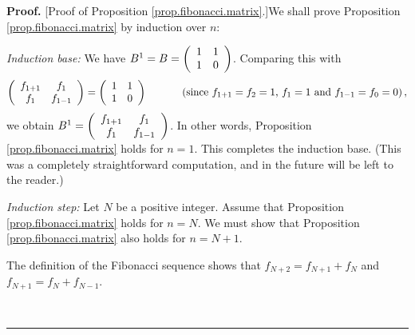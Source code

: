 \documentclass[numbers=enddot,12pt,final,onecolumn,notitlepage]{scrartcl}%
\theoremstyle{definition}
\newenvironment{proof}[1][Proof]{\noindent\textbf{#1.} }{\ \rule{0.5em}{0.5em}}
\begin{document}
\begin{proof}
[Proof of Proposition \ref{prop.fibonacci.matrix}.]We shall prove Proposition
\ref{prop.fibonacci.matrix} by induction over $n$:

\textit{Induction base:} We have $B^{1}=B=\left(
\begin{array}
[c]{cc}%
1 & 1\\
1 & 0
\end{array}
\right)  $. Comparing this with%
\[
\left(
\begin{array}
[c]{cc}%
f_{1+1} & f_{1}\\
f_{1} & f_{1-1}%
\end{array}
\right)  =\left(
\begin{array}
[c]{cc}%
1 & 1\\
1 & 0
\end{array}
\right)  \ \ \ \ \ \ \ \ \ \ \left(  \text{since }f_{1+1}=f_{2}=1\text{,
}f_{1}=1\text{ and }f_{1-1}=f_{0}=0\right)  ,
\]
we obtain $B^{1}=\left(
\begin{array}
[c]{cc}%
f_{1+1} & f_{1}\\
f_{1} & f_{1-1}%
\end{array}
\right)  $. In other words, Proposition \ref{prop.fibonacci.matrix} holds for
$n=1$. This completes the induction base. (This was a completely
straightforward computation, and in the future will be left to the reader.)

\textit{Induction step:} Let $N$ be a positive integer. Assume that
Proposition \ref{prop.fibonacci.matrix} holds for $n=N$. We must show that
Proposition \ref{prop.fibonacci.matrix} also holds for $n=N+1$.

The definition of the Fibonacci sequence shows that $f_{N+2}=f_{N+1}+f_{N}$
and $f_{N+1}=f_{N}+f_{N-1}$.


\end{proof}
\end{document}
